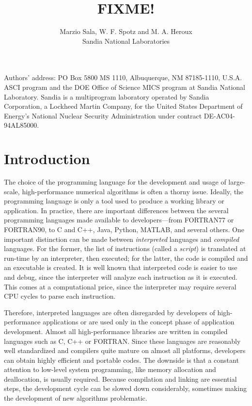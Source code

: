 \documentclass[acmtocl]{acmtrans2m}
\title{FIXME!}
\author{Marzio Sala, W. F. Spotz and M. A. Heroux\\Sandia National Laboratories}
\begin{document}
\setcounter{page}{1}

\begin{bottomstuff}
Authors' address: 
PO Box 5800 MS 1110, Albuquerque, NM 87185-1110, U.S.A.\newline
ASCI program and the DOE Office of Science MICS program at Sandia
  National Laboratory.  Sandia is a multiprogram laboratory operated by
  Sandia Corporation, a Lockheed Martin Company, for the United States
  Department of Energy's National Nuclear Security Administration under
  contract DE-AC04-94AL85000.
\end{bottomstuff}

\maketitle

\section{Introduction}
\label{sec:intro}

The choice of the programming language for the development and usage
of large-scale, high-performance numerical algorithms is often a
thorny issue. Ideally, the programming language is only a tool used
to produce a working library or application. In practice, there are
important differences between the several programming languages made
available to developers---from FORTRAN77 or FORTRAN90, to C and C++,
Java, Python, MATLAB, and several others. One important distinction
can be made between {\sl interpreted} languages and {\sl compiled}
languages. For the former, the list of instructions (called a {\sl
script}) is translated at run-time by an interpreter, then executed;
for the latter, the code is compiled and an executable is created.
It is well known that interpreted code is easier to use and debug,
since the interpreter will analyze each instruction as it is
executed. This comes at a computational price, since the interpreter
may require several CPU cycles to parse each instruction.

Therefore, interpreted languages are often disregarded by developers
of high-performance applications or are used only in the concept
phase of application development. Almost all high-performance
libraries are written in compiled languages such as C, C++ or
FORTRAN. Since these languages are reasonably well standardized and
compilers quite mature on almost all platforms, developers can
obtain highly efficient and portable codes.  The downside is that a
constant attention to low-level system programming, like memory
allocation and deallocation, is usually required. Because
compilation and linking are essential steps, the development cycle
can be slowed down considerably, sometimes making the development of
new algorithms problematic.
\end{document}
